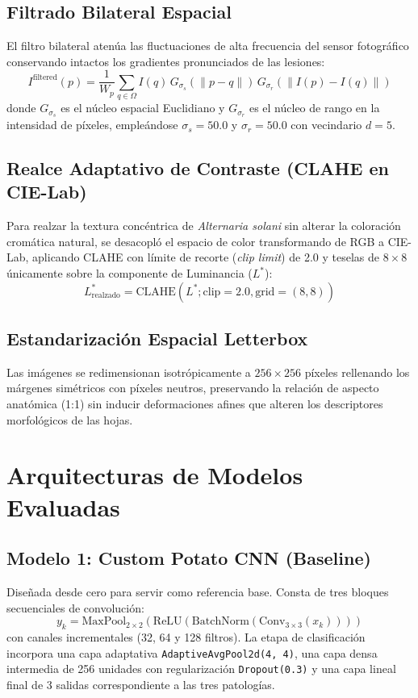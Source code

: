 \documentclass[10pt,a4paper,twoside]{article}
\begin{document}
\subsection{Filtrado Bilateral Espacial}
El filtro bilateral atenúa las fluctuaciones de alta frecuencia del sensor fotográfico conservando intactos los gradientes pronunciados de las lesiones:
\begin{equation}
I^{\text{filtered}}(p) = \frac{1}{W_p} \sum_{q \in \Omega} I(q) \, G_{\sigma_s}(\|p - q\|) \, G_{\sigma_r}(\|I(p) - I(q)\|)
\end{equation}
donde $G_{\sigma_s}$ es el núcleo espacial Euclidiano y $G_{\sigma_r}$ es el núcleo de rango en la intensidad de píxeles, empleándose $\sigma_s = 50.0$ y $\sigma_r = 50.0$ con vecindario $d = 5$.

\subsection{Realce Adaptativo de Contraste (CLAHE en CIE-Lab)}
Para realzar la textura concéntrica de \textit{Alternaria solani} sin alterar la coloración cromática natural, se desacopló el espacio de color transformando de RGB a CIE-Lab, aplicando CLAHE con límite de recorte (\textit{clip limit}) de 2.0 y teselas de $8 \times 8$ únicamente sobre la componente de Luminancia ($L^*$):
\begin{equation}
L^*_{\text{realzado}} = \text{CLAHE}(L^*; \text{clip}=2.0, \text{grid}=(8,8))
\end{equation}

\subsection{Estandarización Espacial Letterbox}
Las imágenes se redimensionan isotrópicamente a $256 \times 256$ píxeles rellenando los márgenes simétricos con píxeles neutros, preservando la relación de aspecto anatómica (1:1) sin inducir deformaciones afines que alteren los descriptores morfológicos de las hojas.

\section{Arquitecturas de Modelos Evaluadas}

\subsection{Modelo 1: Custom Potato CNN (Baseline)}
Diseñada desde cero para servir como referencia base. Consta de tres bloques secuenciales de convolución:
\begin{equation}
y_k = \text{MaxPool}_{2 \times 2}\left(\text{ReLU}\left(\text{BatchNorm}\left(\text{Conv}_{3 \times 3}(x_k)\right)\right)\right)
\end{equation}
con canales incrementales (32, 64 y 128 filtros). La etapa de clasificación incorpora una capa adaptativa \texttt{AdaptiveAvgPool2d(4, 4)}, una capa densa intermedia de 256 unidades con regularización \texttt{Dropout(0.3)} y una capa lineal final de 3 salidas correspondiente a las tres patologías.
\end{document}
